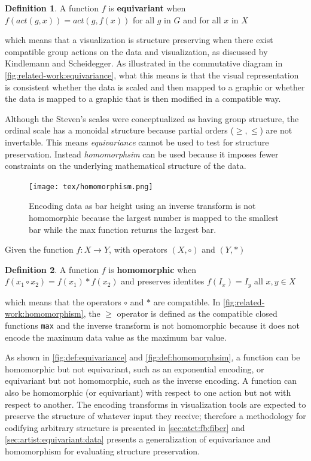\documentclass[journal]{IEEEtran}
\theoremstyle{definition}
\newtheorem{definition}{Definition}[section]
\theoremstyle{remark}
\begin{document}
\begin{definition}\label{def:equivariance}
 A function $f$ is \textbf{equivariant} when $f(act(g,x)) = act(g,f(x))$ for all $g$ in $G$ and for all $x$ in $X$ \cite{pittsNominalSetsNames2013}
\end{definition}
which means that a visualization is structure preserving when there exist compatible group actions on the data and visualization, as discussed by Kindlemann and Scheidegger\cite{kindlmannAlgebraicProcessVisualization2014}. As illustrated in the commutative diagram in \autoref{fig:related-work:equivariance}, what this means is that the visual representation is consistent whether the data is scaled and then mapped to a graphic or whether the data is mapped to a graphic that is then modified in a compatible way.

Although the Steven's scales were conceptualized as having group structure, the ordinal scale has a monoidal structure because partial orders ($\geq, \leq$) are not invertable. This means \textit{equivariance} cannot be used to test for structure preservation. Instead \textit{homomorphsim} can be used because it imposes fewer constraints on the underlying mathematical structure of the data.
\begin{figure}[H]
  \texttt{[image: tex/homomorphism.png]}
  \caption{Encoding data as bar height using an inverse transform is not homomorphic because the largest number is mapped to the smallest bar while the max function returns the largest bar.}
  \label{fig:related-work:homomorphism}
\end{figure}

Given the function $f: X \rightarrow Y$, with operators $(X, \circ)$ and $(Y, *)$

\begin{definition}\label{def:homomorphism}
  A function $f$ is \textbf{homomorphic} when $f(x_1 \circ x_2) = f(x_1) * f(x_2)$ and preserves identites $f(I_x) = I_y$ all $x, y \in X$ \cite{grimaldiDiscreteCombinatorialMathematics2006}

\end{definition}
which means that the operators $\circ$ and $*$ are compatible. In \autoref{fig:related-work:homomorphism}, the $\geq$ operator is defined as the compatible closed functions \texttt{max} and the inverse transform
is not homomorphic because it does not encode the maximum data value as the maximum bar value.

As shown in \autoref{fig:def:equivariance} and \autoref{fig:def:homomorphsim}, a function can be homomorphic but not equivariant, such as an exponential encoding, or equivariant but not homomorphic, such as the inverse encoding. A function can also be homomorphic (or equivariant) with respect to one action but not with respect to another. The encoding transforms in visualization tools are expected to preserve the structure of whatever input they receive; therefore a methodology for codifying arbitrary structure is presented in \autoref{sec:atct:fb:fiber} and \autoref{sec:artist:equivariant:data} presents a generalization of equivariance and homomorphism for evaluating structure preservation.
\end{document}
